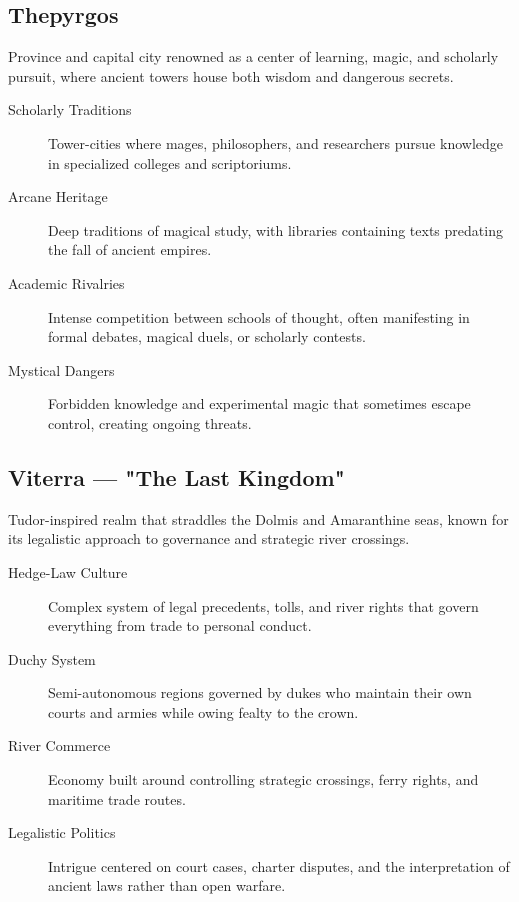 \subsection*{Thepyrgos}

Province and capital city renowned as a center of learning, magic, and scholarly pursuit, where ancient towers house both wisdom and dangerous secrets.

\begin{description}
\item[Scholarly Traditions] Tower-cities where mages, philosophers, and researchers pursue knowledge in specialized colleges and scriptoriums.
\item[Arcane Heritage] Deep traditions of magical study, with libraries containing texts predating the fall of ancient empires.
\item[Academic Rivalries] Intense competition between schools of thought, often manifesting in formal debates, magical duels, or scholarly contests.
\item[Mystical Dangers] Forbidden knowledge and experimental magic that sometimes escape control, creating ongoing threats.
\end{description}

\subsection*{Viterra — "The Last Kingdom"}

Tudor-inspired realm that straddles the Dolmis and Amaranthine seas, known for its legalistic approach to governance and strategic river crossings.

\begin{description}
\item[Hedge-Law Culture] Complex system of legal precedents, tolls, and river rights that govern everything from trade to personal conduct.
\item[Duchy System] Semi-autonomous regions governed by dukes who maintain their own courts and armies while owing fealty to the crown.
\item[River Commerce] Economy built around controlling strategic crossings, ferry rights, and maritime trade routes.
\item[Legalistic Politics] Intrigue centered on court cases, charter disputes, and the interpretation of ancient laws rather than open warfare.
\end{description}

